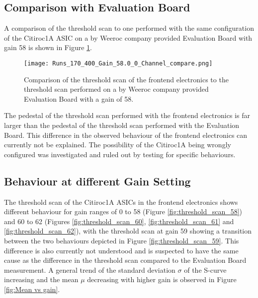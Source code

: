     \subsection{Comparison with Evaluation Board} 
    A comparison of the threshold scan to one performed with the same configuration of the Citiroc1A ASIC on a by Weeroc company provided Evaluation Board with gain 58 is shown in Figure \ref{fig:threshold_scan_comparison_58}.%
    \begin{figure}[H]
        \centering
        \texttt{[image: Runs\_170\_400\_Gain\_58.0\_0\_Channel\_compare.png]}
        \caption{Comparison of the threshold scan of the frontend electronics to the threshold scan performed on a by Weeroc company provided Evaluation Board with a gain of 58.}
        \label{fig:threshold_scan_comparison_58}
    \end{figure}
    
 
    The pedestal of the threshold scan performed with the frontend electronics is far larger than the pedestal of the threshold scan performed with the Evaluation Board.
    This difference in the observed behaviour of the frontend electronics can currently not be explained.
    The possibility of the Citiroc1A being wrongly configured was investigated and ruled out by testing for specific behaviours.
  
    \subsection{Behaviour at different Gain Setting}
    The threshold scan of the Citiroc1A ASICs in the frontend electronics shows different behaviour for gain ranges of 0 to 58 (Figure \ref{fig:threshold_scan_58}) and 60 to 62 (Figures \ref{fig:threshold_scan_60}, \ref{fig:threshold_scan_61} and \ref{fig:threshold_scan_62}),
    with the threshold scan at gain 59 showing a transition between the two behaviours depicted in Figure \ref{fig:threshold_scan_59}.
    This difference is also currently not understood and is suspected to have the same cause as the difference in the threshold scan compared to the Evaluation Board measurement. 
    \newline
    A general trend of the standard deviation $\sigma$ of the S-curve increasing and the mean $\mu$ decreasing with higher gain is observed in Figure \ref{fig:Mean vs gain}.
